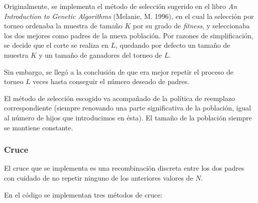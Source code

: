 \documentclass[12pt]{article}
\begin{document}
Originalmente, se implementa el método de selección sugerido en el libro \emph{An Introduction to Genetic Algorithms} (Melanie, M. 1996), en el cual la selección por torneo ordenaba la muestra de tamaño $K$ por su grado de \emph{fitness}, y seleccionaba los dos mejores como padres de la nueva población. Por razones de simplificación, se decide que el corte se realiza en $L$, quedando por defecto un tamaño de muestra $K$ y un tamaño de ganadores del torneo de $L$.

Sin embargo, se llegó a la conclusión de que era mejor repetir el proceso de torneo $L$ veces hasta conseguir el número deseado de padres.

El método de selección escogido va acompañado de la política de reemplazo correspondiente (siempre renovando una parte significativa de la población, igual al número de hijos que introducimos en ésta). El tamaño de la población siempre se mantiene constante.

\subsubsection{Cruce}

El cruce que se implementa es una recombinación discreta entre los dos padres con cuidado de no repetir ninguno de los anteriores valores de $N$.

En el código se implementan tres métodos de cruce:
\end{document}
